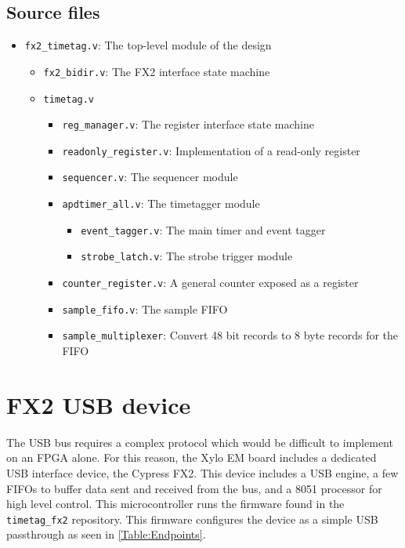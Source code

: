 

\subsection{Source files}
\begin{itemize}
  \item {\tt fx2\_timetag.v}: The top-level module of the design
  \begin{itemize}
    \item {\tt fx2\_bidir.v}: The FX2 interface state machine
    \item {\tt timetag.v}
    \begin{itemize}
      \item {\tt reg\_manager.v}: The register interface state machine
      \item {\tt readonly\_register.v}: Implementation of a read-only register
      \item {\tt sequencer.v}: The sequencer module
      \item {\tt apdtimer\_all.v}: The timetagger module
      \begin{itemize}
        \item {\tt event\_tagger.v}: The main timer and event tagger
        \item {\tt strobe\_latch.v}: The strobe trigger module
      \end{itemize}
      \item {\tt counter\_register.v}: A general counter exposed as a register
      \item {\tt sample\_fifo.v}: The sample FIFO
      \item {\tt sample\_multiplexer}: Convert 48 bit records to 8 byte records for the FIFO
    \end{itemize}
  \end{itemize}
\end{itemize}

\section{FX2 USB device}
The USB bus requires a complex protocol which would be difficult to
implement on an FPGA alone. For this reason, the Xylo EM board
includes a dedicated USB interface device, the Cypress FX2. This
device includes a USB engine, a few FIFOs to buffer data sent and
received from the bus, and a 8051 processor for high level
control. This microcontroller runs the firmware found in the
{\tt timetag\_fx2} repository. This firmware configures the device as
a simple USB passthrough as seen in \ref{Table:Endpoints}.

